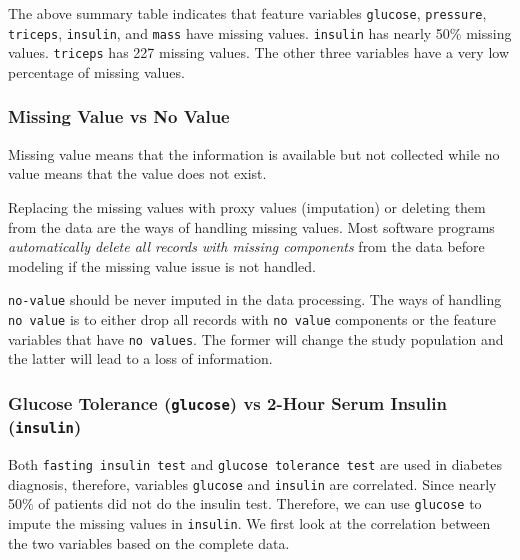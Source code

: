 \documentclass[
]{book}
\begin{document}
The above summary table indicates that feature variables \texttt{glucose}, \texttt{pressure}, \texttt{triceps}, \texttt{insulin}, and \texttt{mass} have missing values. \texttt{insulin} has nearly 50\% missing values. \texttt{triceps} has 227 missing values. The other three variables have a very low percentage of missing values.

\hypertarget{missing-value-vs-no-value}{%
\subsubsection{Missing Value vs No Value}\label{missing-value-vs-no-value}}

Missing value means that the information is available but not collected while no value means that the value does not exist.

Replacing the missing values with proxy values (imputation) or deleting them from the data are the ways of handling missing values. Most software programs \emph{automatically delete all records with missing components} from the data before modeling if the missing value issue is not handled.

\texttt{no-value} should be never imputed in the data processing. The ways of handling \texttt{no\ value} is to either drop all records with \texttt{no\ value} components or the feature variables that have \texttt{no\ values}. The former will change the study population and the latter will lead to a loss of information.

\hfill\break

\hypertarget{glucose-tolerance-glucose-vs-2-hour-serum-insulin-insulin}{%
\subsubsection{\texorpdfstring{Glucose Tolerance (\texttt{glucose}) vs 2-Hour Serum Insulin (\texttt{insulin})}{Glucose Tolerance (glucose) vs 2-Hour Serum Insulin (insulin)}}\label{glucose-tolerance-glucose-vs-2-hour-serum-insulin-insulin}}

Both \texttt{fasting\ insulin\ test} and \texttt{glucose\ tolerance\ test} are used in diabetes diagnosis, therefore, variables \texttt{glucose} and \texttt{insulin} are correlated. Since nearly 50\% of patients did not do the insulin test. Therefore, we can use \texttt{glucose} to impute the missing values in \texttt{insulin}. We first look at the correlation between the two variables based on the complete data.
\end{document}
